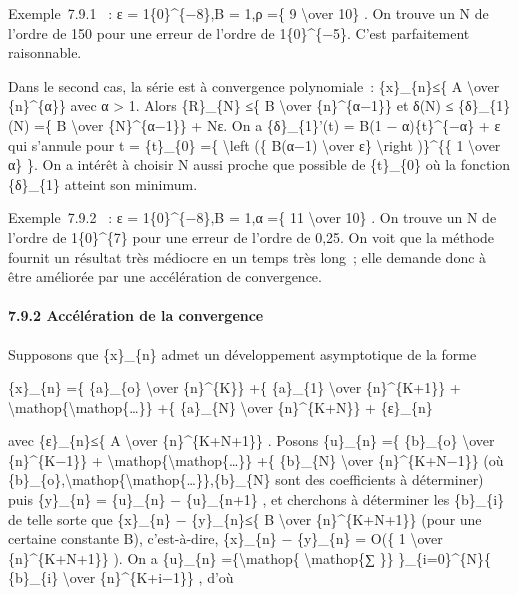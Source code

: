 \documentclass[]{article}
\begin{document}
Exemple~7.9.1 ~: ε = 1\{0\}\^{}\{−8\},B = 1,ρ =\{ 9 \textbackslash{}over
10\} . On trouve un N de l'ordre de 150 pour une erreur de l'ordre de
1\{0\}\^{}\{−5\}. C'est parfaitement raisonnable.

Dans le second cas, la série est à convergence polynomiale~:
\textbar{}\{x\}\_\{n\}\textbar{}≤\{ A \textbackslash{}over
\{n\}\^{}\{α\}\} avec α \textgreater{} 1. Alors \{R\}\_\{N\} ≤\{ B
\textbackslash{}over \{n\}\^{}\{α−1\}\} et δ(N) ≤ \{δ\}\_\{1\}(N) =\{ B
\textbackslash{}over \{N\}\^{}\{α−1\}\} + Nε. On a \{δ\}\_\{1\}'(t) =
B(1 − α)\{t\}\^{}\{−α\} + ε qui s'annule pour t = \{t\}\_\{0\} =\{
\textbackslash{}left (\{ B(α−1) \textbackslash{}over ε\}
\textbackslash{}right )\}\^{}\{\{ 1 \textbackslash{}over α\} \}. On a
intérêt à choisir N aussi proche que possible de \{t\}\_\{0\} où la
fonction \{δ\}\_\{1\} atteint son minimum.

Exemple~7.9.2 ~: ε = 1\{0\}\^{}\{−8\},B = 1,α =\{ 11
\textbackslash{}over 10\} . On trouve un N de l'ordre de 1\{0\}\^{}\{7\}
pour une erreur de l'ordre de 0,25. On voit que la méthode fournit un
résultat très médiocre en un temps très long~; elle demande donc à être
améliorée par une accélération de convergence.

\paragraph{7.9.2 Accélération de la convergence}

Supposons que \{x\}\_\{n\} admet un développement asymptotique de la
forme

\{x\}\_\{n\} =\{ \{a\}\_\{o\} \textbackslash{}over \{n\}\^{}\{K\}\} +\{
\{a\}\_\{1\} \textbackslash{}over \{n\}\^{}\{K+1\}\} +
\textbackslash{}mathop\{\textbackslash{}mathop\{\ldots{}\}\} +\{
\{a\}\_\{N\} \textbackslash{}over \{n\}\^{}\{K+N\}\} + \{ε\}\_\{n\}

avec \textbar{}\{ε\}\_\{n\}\textbar{}≤\{ A \textbackslash{}over
\{n\}\^{}\{K+N+1\}\} . Posons \{u\}\_\{n\} =\{ \{b\}\_\{o\}
\textbackslash{}over \{n\}\^{}\{K−1\}\} +
\textbackslash{}mathop\{\textbackslash{}mathop\{\ldots{}\}\} +\{
\{b\}\_\{N\} \textbackslash{}over \{n\}\^{}\{K+N−1\}\} (où
\{b\}\_\{o\},\textbackslash{}mathop\{\textbackslash{}mathop\{\ldots{}\}\},\{b\}\_\{N\}
sont des coefficients à déterminer) puis \{y\}\_\{n\} = \{u\}\_\{n\} −
\{u\}\_\{n+1\} , et cherchons à déterminer les \{b\}\_\{i\} de telle
sorte que \textbar{}\{x\}\_\{n\} − \{y\}\_\{n\}\textbar{}≤\{ B
\textbackslash{}over \{n\}\^{}\{K+N+1\}\} (pour une certaine constante
B), c'est-à-dire, \{x\}\_\{n\} − \{y\}\_\{n\} = O(\{ 1
\textbackslash{}over \{n\}\^{}\{K+N+1\}\} ). On a \{u\}\_\{n\}
=\{\textbackslash{}mathop\{ \textbackslash{}mathop\{∑ \}\}
\}\_\{i=0\}\^{}\{N\}\{ \{b\}\_\{i\} \textbackslash{}over
\{n\}\^{}\{K+i−1\}\} , d'où
\end{document}
